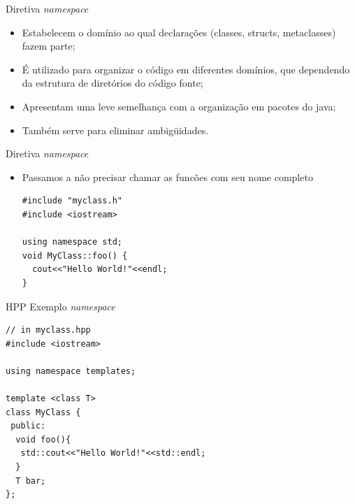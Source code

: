 \documentclass[12pt,table,xcolor={dvipsnames}]{beamer}
\begin{document}
\begin{frame}[fragile]{Diretiva \textit{namespace}}
\begin{itemize}
\item Estabelecem o domínio ao qual declarações (classes, structs, metaclasses) fazem parte;
\item É utilizado para organizar o código em diferentes domínios, que dependendo da
estrutura de diretórios do código fonte;
\item Apresentam uma leve semelhança com a organização em pacotes do java;
\item Também serve para eliminar ambigüidades.
\end{itemize}
\end{frame}

\begin{frame}[fragile]{Diretiva \textit{namespace}}
\begin{itemize}
\begin{lstlisting}
#include "myclass.h"
#include <iostream>
void MyClass::foo() {
  std::cout<<"Hello World!"<<std::endl;
}\end{lstlisting}
\item Passamos a não precisar chamar as funcões com seu nome completo
\begin{lstlisting}
#include "myclass.h"
#include <iostream>

using namespace std;
void MyClass::foo() {
  cout<<"Hello World!"<<endl;
}
\end{lstlisting}

\end{itemize}
\end{frame}

\begin{frame}[fragile]{HPP Exemplo \textit{namespace}}
\begin{lstlisting}
// in myclass.hpp
#include <iostream>

using namespace templates;

template <class T>
class MyClass {
 public:
  void foo(){
   std::cout<<"Hello World!"<<std::endl;
  }
  T bar;
};
\end{lstlisting}
\end{frame}
\end{document}
